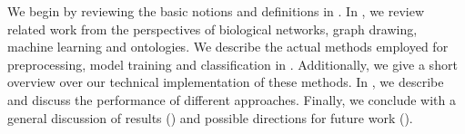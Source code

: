\documentclass[
	fontsize=10pt, %
	twoside=true, %
	secnumdepth=1, %
  toc=indentunnumbered %
]{kaobook}
\begin{document}




We begin by reviewing the basic notions and definitions in
. In , we review related work from the
perspectives of biological networks, graph drawing, machine learning and ontologies.
We describe the actual methods employed for preprocessing, model training and
classification in . Additionally, we give a short overview over
our technical implementation of these methods. In ,
we describe and discuss the performance of different approaches. Finally, we
conclude with a general discussion of results () and
possible directions for future work ().











\end{document}
